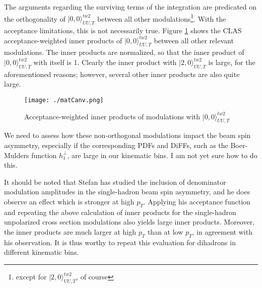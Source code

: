\documentclass[12pt]{article}
\begin{document}
The arguments regarding the surviving terms of the integration are predicated on
the orthogonality of $|0,0\rangle_{UU,T}^{tw2}$ between all other
modulations\footnote{except for $|2,0\rangle_{UU,T}^{tw2}$, of course}. With the
acceptance limitations, this is not necessarily true. Figure \ref{innerproducts}
shows the CLAS acceptance-weighted inner products of $|0,0\rangle_{UU,T}^{tw2}$
between all other relevant modulations. The inner products are normalized, so
that the inner product of $|0,0\rangle_{UU,T}^{tw2}$ with itself is 1. Clearly
the inner product with $|2,0\rangle_{UU,T}^{tw2}$ is large, for the
aforementioned reasons; however, several other inner products are also quite
large.


\begin{figure}[h!]
\centering
\texttt{[image: ./matCanv.png]}
\caption{Acceptance-weighted inner products of modulations with $|0,0\rangle_{UU,T}^{tw2}$}
\label{innerproducts}
\end{figure}

We need to assess how these non-orthogonal modulations impact the beam spin
asymmetry, especially if the corresponding PDFs and DiFFs, such as the
Boer-Mulders function $h_1^{\perp}$, are large in our kinematic bins. I am not
yet sure how to do this.

It should be noted that Stefan has studied the inclusion of denominator
modulation amplitudes in the single-hadron beam spin asymmetry, and he does
observe an effect which is stronger at high $p_T$. Applying his acceptance
function and repeating the above calculation of inner products for the
single-hadron unpolarized cross section modulations also yields large inner
products.  Moreover, the inner products are much larger at high $p_T$ than at
low $p_T$, in agreement with his observation. It is thus worthy to repeat this
evaluation for dihadrons in different kinematic bins. 
\end{document}
